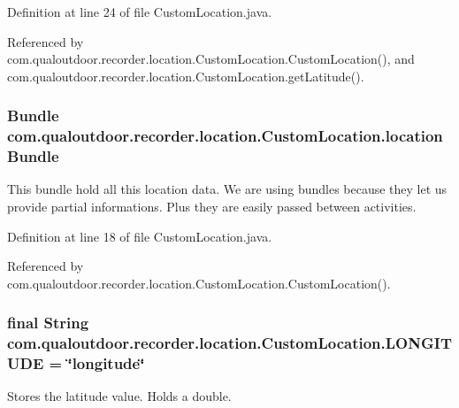 Definition at line 24 of file Custom\-Location.\-java.



Referenced by com.\-qualoutdoor.\-recorder.\-location.\-Custom\-Location.\-Custom\-Location(), and com.\-qualoutdoor.\-recorder.\-location.\-Custom\-Location.\-get\-Latitude().

\hypertarget{classcom_1_1qualoutdoor_1_1recorder_1_1location_1_1CustomLocation_ae6164f889b9fed37331fcbc5df2420f2}{
\subsubsection[{location\-Bundle}]{\setlength{\rightskip}{0pt plus 5cm}Bundle com.\-qualoutdoor.\-recorder.\-location.\-Custom\-Location.\-location\-Bundle\hspace{0.3cm}{\ttfamily [private]}}}\label{classcom_1_1qualoutdoor_1_1recorder_1_1location_1_1CustomLocation_ae6164f889b9fed37331fcbc5df2420f2}
This bundle hold all this location data. We are using bundles because they let us provide partial informations. Plus they are easily passed between activities. 

Definition at line 18 of file Custom\-Location.\-java.



Referenced by com.\-qualoutdoor.\-recorder.\-location.\-Custom\-Location.\-Custom\-Location().

\hypertarget{classcom_1_1qualoutdoor_1_1recorder_1_1location_1_1CustomLocation_aa0d072cccd2d0a4e23d3de0eff553d42}{
\subsubsection[{L\-O\-N\-G\-I\-T\-U\-D\-E}]{\setlength{\rightskip}{0pt plus 5cm}final String com.\-qualoutdoor.\-recorder.\-location.\-Custom\-Location.\-L\-O\-N\-G\-I\-T\-U\-D\-E = \char`\"{}longitude\char`\"{}\hspace{0.3cm}{\ttfamily [static]}}}\label{classcom_1_1qualoutdoor_1_1recorder_1_1location_1_1CustomLocation_aa0d072cccd2d0a4e23d3de0eff553d42}
Stores the latitude value. Holds a double. 

